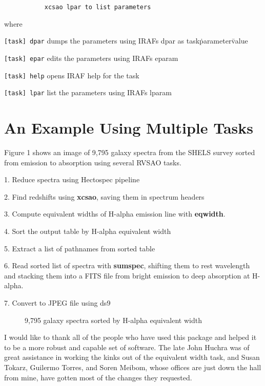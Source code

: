 \texttt{~~~~~~~~~~~xcsao lpar to list parameters}

where

\texttt{[task] dpar} dumps the parameters using IRAFs dpar as task\.parameter\=value

\texttt{[task] epar} edits the parameters using IRAFs eparam

\texttt{[task] help} opens IRAF help for the task

\texttt{[task] lpar} list the parameters using IRAFs lparam

\section*{An Example Using Multiple Tasks}

Figure 1 shows an image of 9,795 galaxy spectra from the SHELS survey
\citep{shels_2005}
sorted from emission to absorption using several RVSAO tasks.

1.  Reduce spectra using Hectospec pipeline

2.  Find redshifts using \textbf{xcsao}, saving them in spectrum headers

3.  Compute equivalent widths of H-alpha emission line with \textbf{eqwidth}.

4. Sort the output table by H-alpha equivalent width

5. Extract a list of pathnames from sorted table

6. Read sorted list of spectra with \textbf{sumspec}, shifting them to rest wavelength and
stacking them into a FITS file from bright emission to deep absorption at H-alpha.

7. Convert to JPEG file using ds9

\begin{figure}[!ht]
\caption{9,795 galaxy spectra sorted by H-alpha equivalent width}
\end{figure}

\acknowledgements
I would like to thank all of the people who have used this package and helped
it to be a more robust and capable set of software.  The late John Huchra was of
great assistance in working the kinks out of the equivalent width task, and
Susan Tokarz, Guilermo Torres, and Soren Meibom, whose offices are just down
the hall from mine, have gotten most of the changes they requested.



